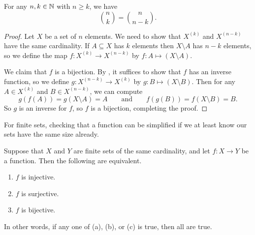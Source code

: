 \documentclass[../notes.tex]{subfiles}
\begin{document}
\begin{example}
    For any $n,k\in\mathbb N$ with $n\ge k$, we have
    \[\binom nk = \binom{n}{n-k}.\]
\end{example}
\begin{proof}
    Let $X$ be a set of $n$ elements. We need to show that $X^{(k)}$ and $X^{(n-k)}$ have the same cardinality. If $A \subseteq X$ has $k$ elements then $X\setminus A$ has $n-k$ elements, so we define the map $f\colon X^{(k)}\to X^{(n-k)}$ by $f\colon A\mapsto(X\setminus A)$.
    
    We claim that $f$ is a bijection. By , it suffices to show that $f$ has an inverse function, so we define $g\colon X^{(n-k)}\to X^{(k)}$ by $g\colon B\mapsto(X\setminus B)$. Then for any $A\in X^{(k)}$ and $B\in X^{(n-k)}$, we can compute
    \[g(f(A))=g(X\setminus A)=A\qquad\text{and}\qquad f(g(B))=f(X\setminus B)=B.\]
    So $g$ is an inverse for $f$, so $f$ is a bijection, completing the proof.
\end{proof}
For finite sets, checking that a function can be simplified if we at least know our sets have the same size already.
\begin{prop} \label{prop:finite-inj-surj-bij}
    Suppose that $X$ and $Y$ are finite sets of the same cardinality, and let $f\colon X \to Y$ be a function. Then the following are equivalent.
    \begin{enumerate}[label=(\alph*)]
        \item $f$ is injective.
        \item $f$ is surjective.
        \item $f$ is bijective.
    \end{enumerate}
    In other words, if any one of (a), (b), or (c) is true, then all are true.
\end{prop}
\end{document}
